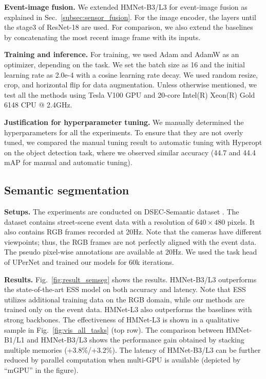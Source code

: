 \vspace{0.1cm}
\noindent
\textbf{Event-image fusion.}
We extended HMNet-B3/L3 for event-image fusion as explained in Sec.~\ref{subsec:sensor_fusion}.
For the image encoder, the layers until the stage3 of ResNet-18 \cite{He2016} are used.
For comparison, we also extend the baselines by concatenating the most recent image frame with its inputs.


\vspace{0.1cm}
\noindent
\textbf{Training and inference.}
For training, we used Adam \cite{Kingma2015} and AdamW \cite{Loshchilov2019} as an optimizer, depending on the task. We set the batch size as 16 and the initial learning rate as 2.0e-4 with a cosine learning rate decay.
We used random resize, crop, and horizontal flip for data augmentation.
Unless otherwise mentioned, we test all the methods using Tesla V100 GPU and 20-core Intel(R) Xeon(R) Gold 6148 CPU @ 2.4GHz.

\vspace{0.1cm}
\noindent
\textbf{Justification for hyperparameter tuning.}
We manually determined the hyperparameters for all the experiments.
To ensure that they are not overly tuned, we compared the manual tuning result to automatic tuning with Hyperopt \cite{Bergstra2013} on the object detection task, where we observed similar accuracy (44.7 and 44.4 mAP for manual and automatic tuning).



\subsection{Semantic segmentation}
\label{sec:semantic_segmentation}

\noindent
\textbf{Setups.}
The experiments are conducted on DSEC-Semantic dataset \cite{Sun2022}.
The dataset contains street-scene event data with a resolution of $640 \times 480$ pixels.
It also contains RGB frames recorded at 20Hz. Note that the cameras have different viewpoints; thus, the RGB frames are not perfectly aligned with the event data.
The pseudo pixel-wise annotations are available at 20Hz.
We used the task head of UPerNet \cite{Xiao2018} and trained our models for 60k iterations.

\tbSemsegFusion

\figVisAllTasks

\vspace{0.1cm}
\noindent
\textbf{Results.}
Fig.~\ref{fig:result_semseg} shows the results.
HMNet-B3/L3 outperforms the state-of-the-art ESS model \cite{Sun2022} on both accuracy and latency. Note that ESS utilizes additional training data on the RGB domain, while our methods are trained only on the event data.
HMNet-L3 also outperforms the baselines with strong backbones.
The effectiveness of HMNet-L3 is shown in a qualitative sample in Fig.~\ref{fig:vis_all_tasks} (top row).
The comparison between HMNet-B1/L1 and HMNet-B3/L3 shows the performance gain obtained by stacking multiple memories (+3.8\%/+3.2\%).
The latency of HMNet-B3/L3 can be further reduced by parallel computation when multi-GPU is available (depicted by ``mGPU'' in the figure).

